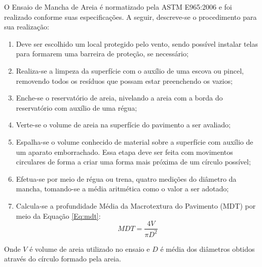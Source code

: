 O Ensaio de Mancha de Areia é normatizado pela ASTM E965:2006 \nocite{astme965} e foi realizado conforme suas especificações. A seguir, descreve-se o procedimento para sua realização: 
\begin{enumerate}
\item Deve ser escolhido um local protegido pelo vento, sendo possível instalar telas para formarem uma barreira de proteção, se necessário; 

\item Realiza-se a limpeza da superfície com o auxílio de uma escova ou pincel, removendo todos os resíduos que possam estar preenchendo os vazios; 

\item Enche-se o reservatório de areia, nivelando a areia com a borda do reservatório com auxílio de uma régua;

\item Verte-se o volume de areia na superfície do pavimento a ser avaliado;

\item Espalha-se o volume conhecido de material sobre a superfície com auxílio de um aparato emborrachado. Essa etapa deve ser feita com movimentos circulares de forma a criar uma forma mais próxima de um círculo possível; 

\item Efetua-se por meio de régua ou trena, quatro medições do diâmetro da mancha, tomando-se a média aritmética como o valor a ser adotado;

\item Calcula-se a profundidade Média da Macrotextura do Pavimento (MDT) por meio da Equação \ref{Eq:mdt}:
\begin{equation}\label{Eq:mdt}
%
MDT = \frac{4V}{\pi D^2}
%
\end{equation}
%
\end{enumerate}

Onde $V$ é volume de areia utilizado no ensaio e $D$ é média dos diâmetros obtidos através do círculo formado pela areia.

